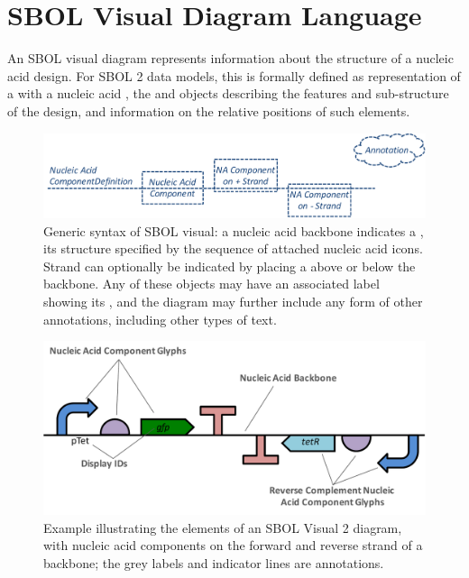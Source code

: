 \section{SBOL Visual Diagram Language}
\label{sec:language}

An SBOL visual diagram represents information about the structure of a nucleic acid design.
For SBOL 2 data models, this is formally defined as representation of a  with a nucleic acid , the  and  objects describing the features and sub-structure of the design, and  information on the relative positions of such elements.

\begin{figure}[h!]
\centering
\includegraphics[width=6in]{figures/SBOLsyntax.pdf}
\caption{Generic syntax of SBOL visual:  
a nucleic acid backbone indicates a , its structure specified by the sequence of attached nucleic acid  icons.  
Strand can optionally be indicated by placing a  above or below the backbone.  
Any of these objects may have an associated label showing its , and the diagram may further include any form of other annotations, including other types of text.}
\label{f:syntax}
\end{figure}

\begin{figure}[h!]
\centering
\includegraphics[width=6in]{figures/SBOLgeneral.pdf}
\caption{Example illustrating the elements of an SBOL Visual 2 diagram, with nucleic acid components on the forward and reverse strand of a backbone; the grey labels and indicator lines are annotations.}
\label{f:example}
\end{figure}

